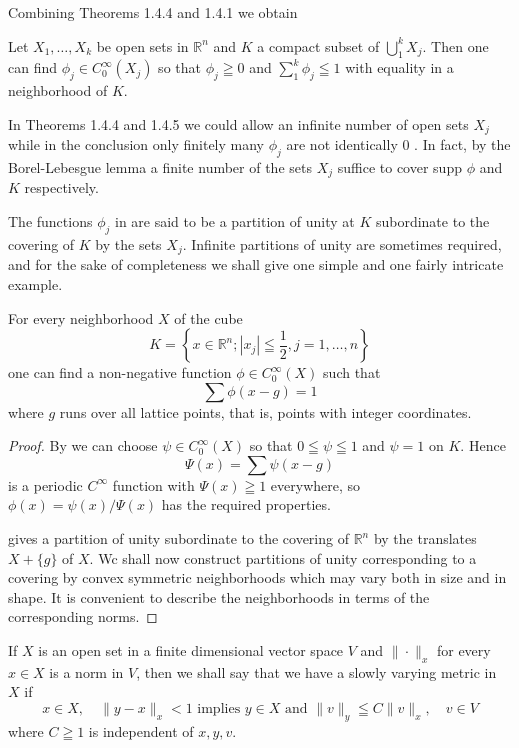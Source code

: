 Combining Theorems 1.4.4 and 1.4.1 we obtain
\begin{theorem}
    Let $X_{1}, \ldots, X_{k}$ be open sets in $\mathbb{R}^{n}$ and $K$ a compact
    subset of $\bigcup_1^k X_j$. Then one can find $\phi_j \in C_0^{\infty}\left(X_j\right)$ so that $\phi_j \geqq 0$ and
$\sum_{1}^{k} \phi_{j} \leqq 1$ with equality in a neighborhood of $K$.
\end{theorem}
\begin{remark}
    In Theorems 1.4.4 and 1.4.5 we could allow an infinite number of open sets $X_{j}$ while in the conclusion only finitely many $\phi_{j}$ are not identically 0 . In fact, by the Borel-Lebesgue lemma a finite number of the sets $X_{j}$ suffice to cover supp $\phi$ and $K$ respectively.

The functions $\phi_{j}$ in  are said to be a partition of unity at $K$ subordinate to the covering of $K$ by the sets $X_{j}$. Infinite partitions of unity are sometimes required, and for the sake of completeness we shall give one simple and one fairly intricate example.
\end{remark}
\begin{theorem}
    For every neighborhood $X$ of the cube
\[
	K=\left\{x \in \mathbb{R}^{n} ;\left|x_{j}\right| \leqq \frac{1}{2}, j=1, \ldots, n\right\}
\]
one can find a non-negative function $\phi \in C_{0}^{\infty}(X)$ such that
\[
	\sum \phi(x-g)=1
\]
where $g$ runs over all lattice points, that is, points with integer coordinates.
\end{theorem}
\begin{proof}
    By  we can choose $\psi \in C_{0}^{\infty}(X)$ so that $0 \leqq \psi \leqq 1$ and $\psi=1$ on $K$. Hence
\[
	\Psi(x)=\sum \psi(x-g)
\]
is a periodic $C^{\infty}$ function with $\Psi(x) \geqq 1$ everywhere, so $\phi(x)=\psi(x) / \Psi(x)$ has the required properties.

 gives a partition of unity subordinate to the covering of $\mathbb{R}^{n}$ by the translates $X+\{g\}$ of $X$. Wc shall now construct partitions of unity corresponding to a covering by convex symmetric neighborhoods which may vary both in size and in shape. It is convenient to describe the neighborhoods in terms of the corresponding norms.
\end{proof}

\begin{defi}
    If $X$ is an open set in a finite dimensional vector space $V$ and $\|\cdot \|_{x}$ for every $x \in X$ is a norm in $V$, then we shall say that we have a slowly varying metric in $X$ if
\begin{equation}
    \label{(1.4.5)}
    x \in X, \quad\|y-x\|_{x}<1 \text{ implies } y \in X \text{ and } \|v\|_{y} \leqq C\|v\|_{x}, \quad v \in V
\end{equation}
where $C \geqq 1$ is independent of $x, y, v$.
\end{defi}


